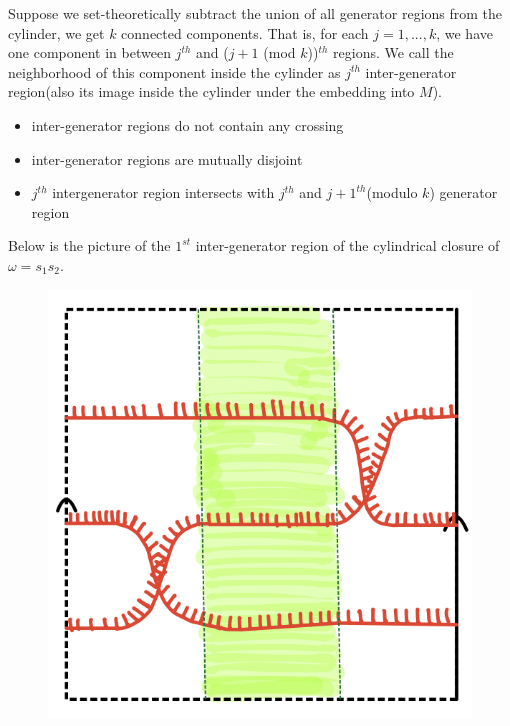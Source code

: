\begin{definition}
Suppose we set-theoretically subtract the union of all generator regions from the cylinder, we get $k$ connected components. That is, for each $j = 1,...,k$, we have one component in between $j^{th}$ and ($j+1$ (mod $k$))$^{th}$ regions. We call the neighborhood of this component inside the cylinder as  $j^{th}$ inter-generator region(also its image inside the cylinder under the embedding into $M$).

\begin{itemize}
\item inter-generator regions do not contain any crossing
\item inter-generator regions are mutually disjoint
\item $j^{th}$ intergenerator region intersects with $j^{th}$ and $j+1^{th}$(modulo $k$) generator region
\end{itemize}
\end{definition}

Below is the picture of the $1^{st}$ inter-generator region of the cylindrical closure of $\omega = s_1 s_2$.

\begin{figure}[H] 
    \centering
    \includegraphics[scale = 0.95]{diagrams/natural_alternating_diagrams/7-1.png}
    \caption{}
    \label{fig:your-label}
\end{figure}

